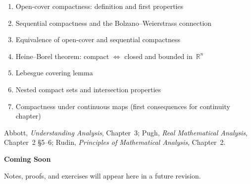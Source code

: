 \begin{enumerate}
  \item Open-cover compactness: definition and first properties
  \item Sequential compactness and the Bolzano--Weierstrass connection
  \item Equivalence of open-cover and sequential compactness
  \item Heine--Borel theorem: compact $\Leftrightarrow$ closed and
        bounded in~$\mathbb{R}^n$
  \item Lebesgue covering lemma
  \item Nested compact sets and intersection properties
  \item Compactness under continuous maps (first consequences
        for continuity chapter)
\end{enumerate}

\begin{remark*}
Abbott, \textit{Understanding Analysis}, Chapter~3;
Pugh, \textit{Real Mathematical Analysis}, Chapter~2 §5--6;
Rudin, \textit{Principles of Mathematical Analysis}, Chapter~2.
\end{remark*}

\vspace{1em}
\begin{tcolorbox}[
  colback=gray!6, colframe=gray!40, arc=2pt,
  left=8pt, right=8pt, top=6pt, bottom=6pt,
  title={\small\textbf{Status: Planned}},
  fonttitle=\small\bfseries
]
\begin{center}\Large\bfseries Coming Soon\end{center}
\vspace{6pt}
\noindent Notes, proofs, and exercises will appear here in a future revision.
\end{tcolorbox}



% 
% 
% 
% 
% 
